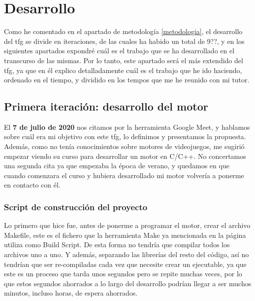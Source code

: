 
\chapter{Desarrollo}
\label{desarrollo}

Como he comentado en el apartado de metodología \ref{metodologia}, el desarrollo del \gls{tfg} se divide en iteraciones, de las cuales ha habido un total de 9??, y en los siguientes apartados expondré cuál es el trabajo que se ha desarrollado en el transcurso de las mismas.
Por lo tanto, este apartado será el más extendido del \gls{tfg}, ya que en él explico detalladamente cuál es el trabajo que he ido haciendo, ordenado en el tiempo, y dividido en los tempos que me he reunido con mi tutor.

\section{Primera iteración: desarrollo del motor}
El \textbf{7 de julio de 2020} nos citamos por la herramienta Google Meet, y hablamos sobre cuál era mi objetivo con este \gls{tfg}, lo definimos y presentamos la propuesta. Además, como no tenía conocimientos sobre motores de videojuegos, me sugirió empezar viendo su curso para desarrollar un motor en C/C++. No concertamos una segunda cita ya que empezaba la época de verano, y quedamos en que cuando comenzara el curso y hubiera desarrollado mi motor volvería a ponerme en contacto con él.

\subsection{Script de construcción del proyecto}
Lo primero que hice fue, antes de ponerme a programar el motor, crear el archivo Makefile, este es el fichero que la herramienta Make ya mencionada en la página \pageref{herramientas} utiliza como Build Script. De esta forma no tendría que compilar todos los archivos uno a uno. Y además, separando las librerías del resto del código, así no tendrían que ser re-compiladas cada vez que necesite crear un ejecutable, ya que este es un proceso que tarda unos segundos pero se repite muchas veces, por lo que estos segundos ahorrados a lo largo del desarrollo podrían llegar a ser muchos minutos, incluso horas, de espera ahorrados.

